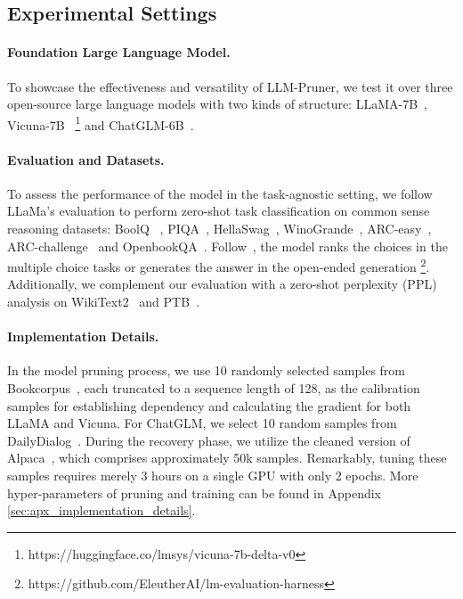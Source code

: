 \documentclass{article}
\begin{document}
\subsection{Experimental Settings}
\paragraph{Foundation Large Language Model.}
To showcase the effectiveness and versatility of LLM-Pruner, we test it over three open-source large language models with two kinds of structure: LLaMA-7B~\cite{touvron2023llama}, Vicuna-7B~\cite{vicuna2023} \footnote{https://huggingface.co/lmsys/vicuna-7b-delta-v0} and ChatGLM-6B~\cite{zeng2022glm}. %

\paragraph{Evaluation and Datasets.} To assess the performance of the model in the task-agnostic setting, we follow LLaMa's evaluation to perform zero-shot task classification on common sense reasoning datasets: BoolQ ~\cite{clark-etal-2019-boolq}, PIQA~\cite{Bisk2020piqa}, HellaSwag~\cite{zellers2019hellaswag}, WinoGrande~\cite{ai2:winogrande}, ARC-easy~\cite{allenai:arc}, ARC-challenge~\cite{allenai:arc} and OpenbookQA~\cite{OpenBookQA2018}. Follow~\cite{eval-harness}, the model ranks the choices in the multiple choice tasks or generates the answer in the open-ended generation \footnote{https://github.com/EleutherAI/lm-evaluation-harness}. Additionally, we complement our evaluation with a zero-shot perplexity (PPL) analysis on WikiText2~\cite{merity2016pointer} and PTB~\cite{marcus-etal-1993-building}. %

\paragraph{Implementation Details.} 
In the model pruning process, we use 10 randomly selected samples from Bookcorpus~\cite{Zhu_2015_ICCV}, each truncated to a sequence length of 128, as the calibration samples for establishing dependency and calculating the gradient for both LLaMA and Vicuna. For ChatGLM, we select 10 random samples from DailyDialog~\cite{li2017dailydialog}. During the recovery phase, we utilize the cleaned version of Alpaca~\cite{alpaca}, which comprises approximately 50k samples. Remarkably, tuning these samples requires merely 3 hours on a single GPU with only 2 epochs. More hyper-parameters of pruning and training can be found in Appendix \ref{sec:apx_implementation_details}.
\end{document}
